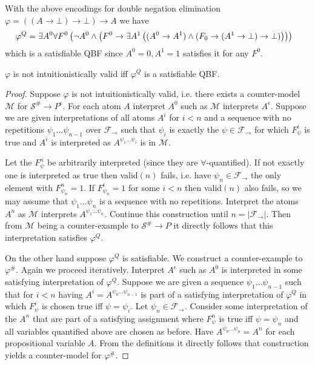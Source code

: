 \documentclass[a4paper,UKenglish,cleveref, autoref, thm-restate]{lipics-v2021}
\begin{document}
\begin{example}
	With the above encodings for double negation elimination $\varphi = ((A\to \bot)\to \bot)\to A$ we have
	$$\hspace*{-.3cm}
	\varphi^Q = \exists A^0\forall F^0\left(\neg A^0\wedge\left(F^0\to \exists A^1\left((A^0\to A^1)\wedge(F_0\to (A^1\to \bot)\to \bot)\right)\right)\right)
	$$
	which is a satisfiable QBF since $A^0 = 0, A^1 = 1$ satisfies it for any $F^0$.
\end{example}


\begin{lemma}
	$\varphi$ is not intuitionistically valid iff $\varphi^Q$ is a satisfiable QBF.
\end{lemma}
\begin{proof}
	Suppose $\varphi$ is not intuitionistically valid, i.e. there exists a counter-model $\mathcal M$ for $\mathcal S^\#\to P^\epsilon$. For each atom $A$ interpret $A^0$ such as $\mathcal M$ interprets $A^\epsilon$. Suppose we are given interpretations of all atoms $A^i$ for $i < n$ and a sequence with no repetitions $\psi_1\dots\psi_{n-1}$ over $\mathcal F_\to$ such that $\psi_i$ is exactly the $\psi\in\mathcal F_\to$ for which $F_{\psi}^i$ is true and $A^i$ is interpreted as $A^{\psi_1\dots\psi_i}$ is in $\mathcal M$.
	
	Let the $F^{n}_\psi$ be arbitrarily interpreted (since they are $\forall$-quantified). If not exactly one is interpreted as true then valid$(n)$ fails, i.e. have $\psi_n\in\mathcal F_\to$ the only element with $F^n_{\psi_n} = 1$. If $F^i_{\psi_n} = 1$ for some $i < n$ then valid$(n)$ also fails, so we may assume that $\psi_1\dots\psi_n$ is a sequence with no repetitions. Interpret the atoms $A^n$ as $\mathcal M$ interprets $A^{\psi_1\dots\psi_n}$. Continue this construction until $n  = |\mathcal F_\to|$. Then from $\mathcal M$ being a counter-example to $\mathcal S^\#\to P$ it directly follows that this interpretation satisfies $\varphi^Q$.
	
	On the other hand suppose $\varphi^Q$ is satisfiable. We construct a counter-example to $\varphi^\#$.
	Again we proceed iteratively. Interpret $A^\epsilon$ such as $A^0$ is interpreted in some satisfying interpretation of $\varphi^Q$. Suppose we are given a sequence $\psi_1\dots \psi_{n-1}$ such that for $i<n$ having $A^i = A^{\psi_0\dots\psi_{n-1}}$ is part of a satisfying interpretation of $\varphi^Q$ in which $F^i_\psi$ is chosen true iff $\psi = \psi_i$. Let $\psi_n\in\mathcal F_\to$. Consider some interpretation of the $A^n$ that are part of a satisfying assignment where $F^n_\psi$ is true iff $\psi = \psi_n$ and all variables quantified above are chosen as before. Have $A^{\psi_0\dots\psi_n} = A^n$ for each propositional variable $A$. From the definitions it directly follows that construction yields a counter-model for $\varphi^\#$.
\end{proof}
\end{document}
